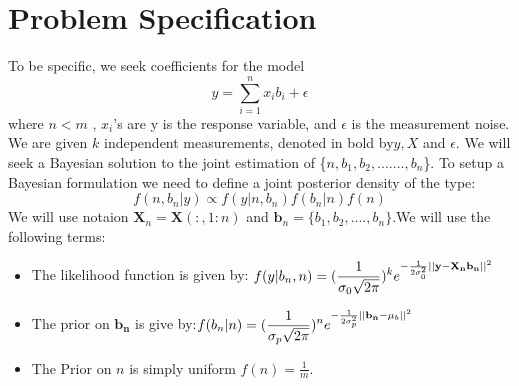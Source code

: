 \documentclass[12pt,a4paper]{article}
\begin{document}
\section{Problem Specification}
To be specific, we seek coefficients for the model
$$y=\sum_{i=1}^{n}x_ib_i+\epsilon$$
where $n<m$ , $x_i$'s are y is the response variable, and $\epsilon$ is the measurement noise. We are given $k$ independent measurements, denoted in bold by\textbf{$y, X$} and $\epsilon$. We will seek a Bayesian solution to the joint estimation of \{$n,b_1,b_2,.......,b_n$\}.
\newline
To setup a Bayesian formulation we need to define a joint posterior density of the type:
$$f(n,b_n|y)\propto f(y|n,b_n)f(b_n|n)f(n)$$
We will use notaion $\textbf{X}_n=\textbf{X}(:,1:n)$ and $\textbf{b}_n=\{b_1,b_2,....,b_n\}$.We will use the following terms:
\begin{itemize}
    \item The likelihood function is given by: $\mathlarger{f(y|b_n,n)=(\frac{1}{\sigma_0\sqrt{2\pi}})^ke^{-\frac{1}{2\sigma_0^2}||{\mathbf{y-X_n b_n}}||^2}}$
    \item The prior on $\mathbf{b_n}$ is give by:$\mathlarger{f(b_n|n)=(\frac{1}{\sigma_p\sqrt{2\pi}})^ne^{-\frac{1}{2\sigma_p^2}||{\mathbf{b_n}-\mu_b}||^2}}$
    \item The Prior on $n$ is simply uniform $f(n)=\frac{1}{m}$.
\end{itemize}
\end{document}
